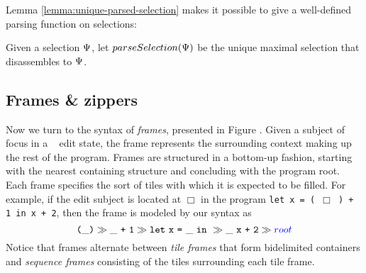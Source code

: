 Lemma \ref{lemma:unique-parsed-selection} makes it
possible to give a well-defined parsing function
on selections:
\begin{definition}
  Given a selection $\Psi$, let $parseSelection(\Psi)$ be
  the unique maximal selection that disassembles
  to $\Psi$.
\end{definition}










\subsection{Frames \& zippers}
Now we turn to the syntax of \emph{frames}, presented
in Figure .
Given a subject of focus in a \ty~ edit state, the frame
represents the surrounding context making up the rest of the program.
Frames are structured in a bottom-up fashion, starting
with the nearest containing structure and concluding
with the program root.
Each frame specifies the sort of tiles with which it is
expected to be filled.
For example, if the edit subject is located at $\Box$
in the program \texttt{let x = ( $\Box$ ) + 1 in x + 2},
then the frame is modeled by our syntax as
\[
  \tframelit{
    \sparen{\_}
  }{
    \tframelit{
      \_\splus{}{\texttt{1}}
    }{
      \tframelit{
        \slet{\texttt{x}}{\_}{}
      }{
        \tframelit{
          \_\ \splus{\texttt{x}}{\texttt{2}}
        }{
          \note{root}
        }
      }
    }
  }
\]
Notice that frames alternate between \emph{tile
frames} that form bidelimited containers and
\emph{sequence frames} consisting of the tiles
surrounding each tile frame.

